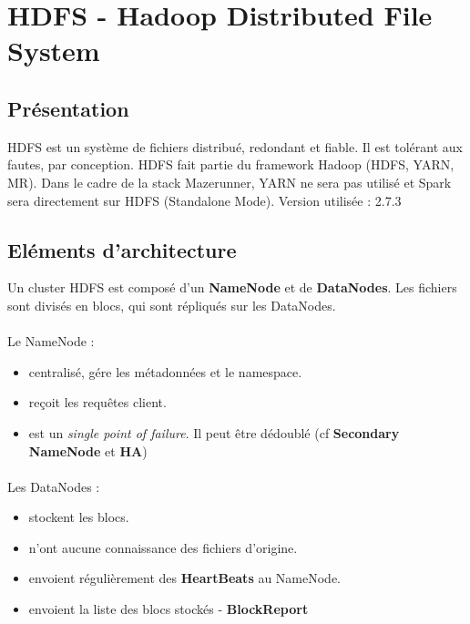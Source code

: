 \section{HDFS - Hadoop Distributed File System}

\subsection{Présentation}

HDFS est un système de fichiers distribué, redondant et fiable. Il est tolérant aux fautes, par conception.
HDFS fait partie du framework Hadoop (HDFS, YARN, MR). Dans le cadre de la stack Mazerunner, YARN ne sera pas utilisé et Spark sera directement sur HDFS (Standalone Mode).
Version utilisée : 2.7.3


\subsection{Eléments d'architecture}

Un cluster HDFS est composé d'un \textbf{NameNode} et de \textbf{DataNodes}.
Les fichiers sont divisés en blocs, qui sont répliqués sur les DataNodes. \\

\paragraph{}Le NameNode :
\begin{itemize}
	\item centralisé, gére les métadonnées et le namespace.
	\item reçoit les requêtes client.
	\item est un \textit{single point of failure}. Il peut être dédoublé (cf \textbf{Secondary NameNode} et \textbf{HA})
\end{itemize}

\paragraph{}Les DataNodes :
\begin{itemize}
	\item stockent les blocs.
	\item n'ont aucune connaissance des fichiers d'origine.
	\item envoient régulièrement des \textbf{HeartBeats} au NameNode.
	\item envoient la liste des blocs stockés  - \textbf{BlockReport}
\end{itemize}


